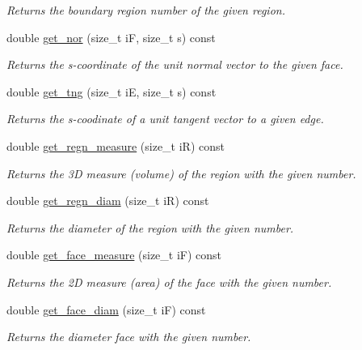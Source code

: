 \begin{DoxyCompactItemize}
\begin{DoxyCompactList}\small\item\em Returns the boundary region number of the given region. \end{DoxyCompactList}\item 
double \hyperlink{classStemMesh3D_1_1mesh__3Dv_a558210d25a3eead99384f039a3419730}{get\+\_\+nor} (size\+\_\+t iF, size\+\_\+t s) const
\begin{DoxyCompactList}\small\item\em Returns the s-\/coordinate of the unit normal vector to the given face. \end{DoxyCompactList}\item 
double \hyperlink{classStemMesh3D_1_1mesh__3Dv_a5977abe45fc95cde4e0125c09df953b1}{get\+\_\+tng} (size\+\_\+t iE, size\+\_\+t s) const
\begin{DoxyCompactList}\small\item\em Returns the s-\/coodinate of a unit tangent vector to a given edge. \end{DoxyCompactList}\item 
double \hyperlink{classStemMesh3D_1_1mesh__3Dv_a1c784e3ea324d11e1ebd51574dcaabde}{get\+\_\+regn\+\_\+measure} (size\+\_\+t iR) const
\begin{DoxyCompactList}\small\item\em Returns the 3D measure (volume) of the region with the given number. \end{DoxyCompactList}\item 
double \hyperlink{classStemMesh3D_1_1mesh__3Dv_acc10571f29f0b076c82571fc6ae33d76}{get\+\_\+regn\+\_\+diam} (size\+\_\+t iR) const
\begin{DoxyCompactList}\small\item\em Returns the diameter of the region with the given number. \end{DoxyCompactList}\item 
double \hyperlink{classStemMesh3D_1_1mesh__3Dv_ad44062545fdcb775a3cb83476750b1cd}{get\+\_\+face\+\_\+measure} (size\+\_\+t iF) const
\begin{DoxyCompactList}\small\item\em Returns the 2D measure (area) of the face with the given number. \end{DoxyCompactList}\item 
double \hyperlink{classStemMesh3D_1_1mesh__3Dv_a8bb48254482f61dc1c6f552f0fa8d7c5}{get\+\_\+face\+\_\+diam} (size\+\_\+t iF) const
\begin{DoxyCompactList}\small\item\em Returns the diameter face with the given number. \end{DoxyCompactList}\item 

\end{DoxyCompactItemize}
